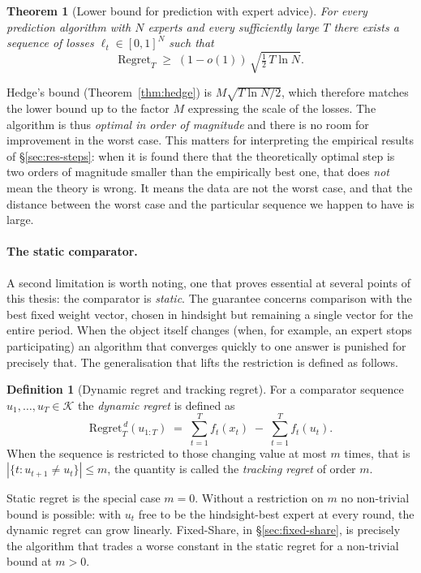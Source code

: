 \documentclass[12pt,a4paper,oneside]{report}
\renewcommand{\_}{\oldunderscore\allowbreak}
\theoremstyle{definition}
\newtheorem{definition}{Definition}[chapter]
\theoremstyle{plain}
\newtheorem{theorem}{Theorem}[chapter]
\theoremstyle{remark}
\begin{document}
\begin{theorem}[Lower bound for prediction with expert advice]
\label{thm:lower-bound}
For every prediction algorithm with $N$ experts and every sufficiently large $T$ there exists a
sequence of losses $\ell_t \in [0,1]^N$ such that
\[
\mathrm{Regret}_T \;\geq\; (1-o(1))\,\sqrt{\tfrac{1}{2}\,T \ln N}.
\]
\end{theorem}

Hedge's bound (Theorem~\ref{thm:hedge}) is $M\sqrt{T\ln N/2}$, which therefore matches the
lower bound up to the factor $M$ expressing the scale of the losses. The algorithm is thus
\emph{optimal in order of magnitude} and there is no room for improvement in the worst case.
This matters for interpreting the empirical results of \S\ref{sec:res-steps}: when it is found
there that the theoretically optimal step is two orders of magnitude smaller than the
empirically best one, that does \emph{not} mean the theory is wrong. It means the data are not
the worst case, and that the distance between the worst case and the particular sequence we
happen to have is large.

\paragraph{The static comparator.} A second limitation is worth noting, one that proves
essential at several points of this thesis: the comparator is \emph{static}. The guarantee
concerns comparison with the best fixed weight vector, chosen in hindsight but remaining a
single vector for the entire period. When the object itself changes (when, for example, an
expert stops participating) an algorithm that converges quickly to one answer is punished for
precisely that. The generalisation that lifts the restriction is defined as follows.

\begin{definition}[Dynamic regret and tracking regret]
\label{def:dynamic-regret}
For a comparator sequence $u_1,\dots,u_T \in \mathcal{K}$ the \emph{dynamic regret} is defined
as
\[
\mathrm{Regret}_T^{\,d}(u_{1:T}) \;=\; \sum_{t=1}^{T} f_t(x_t) \;-\; \sum_{t=1}^{T} f_t(u_t).
\]
When the sequence is restricted to those changing value at most $m$ times, that is
$|\{t : u_{t+1}\neq u_t\}| \leq m$, the quantity is called the \emph{tracking regret} of order
$m$.
\end{definition}

Static regret is the special case $m=0$. Without a restriction on $m$ no non-trivial bound is
possible: with $u_t$ free to be the hindsight-best expert at every round, the dynamic regret
can grow linearly. Fixed-Share, in \S\ref{sec:fixed-share}, is precisely the algorithm that
trades a worse constant in the static regret for a non-trivial bound at $m>0$.
\end{document}
